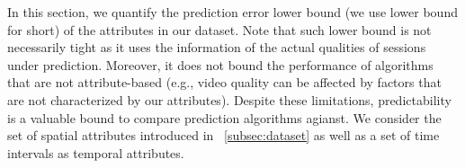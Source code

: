 


\begin{figure}[t!]
\centering
{}
\label{fig:predictability}
\end{figure}




In this section, we quantify the prediction error lower bound (we use lower bound for short) of the attributes in our dataset. Note that such lower bound is not necessarily tight as it uses the information of the actual qualities of sessions under prediction. Moreover, it does not bound the performance of algorithms that are not attribute-based (e.g., video quality can be affected by factors that are not characterized by our attributes).
Despite these limitations, predictability is a valuable bound to compare prediction algorithms agianst. We consider the set of spatial attributes introduced in \Section~\ref{subsec:dataset} as well as a set of time intervals as temporal attributes.

